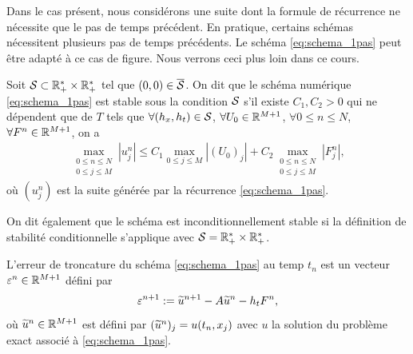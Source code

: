 \documentclass[12pt,a4paper,twoside]{article}
\begin{document}
\begin{remark}
  Dans le cas pr\'esent, nous consid\'erons une suite dont la formule de r\'ecurrence
  ne n\'ecessite que le pas de temps pr\'ec\'edent.
  En pratique, certains sch\'emas n\'ecessitent plusieurs pas de temps pr\'ec\'edents.
  Le sch\'ema \eqref{eq:schema_1pas} peut \^etre adapt\'e \`a ce cas de figure.
  Nous verrons ceci plus loin dans ce cours.
\end{remark}

\begin{definition}[Stabilit\'e]
  \label{def:stabilite}
  Soit $\mathcal{S} \subset \mathbb{R}_+^* \times \mathbb{R}_+^*$ tel que $(0,0) \in \overline{\mathcal{S}}$.
  On dit que le sch\'ema num\'erique \eqref{eq:schema_1pas} est stable 
  sous la condition $\mathcal{S}$ s'il existe $C_1 , C_2 > 0$ qui ne d\'ependent que de $T$
  tels que $\forall (h_x , h_t) \in \mathcal{S}$, $\forall U_0 \in \mathbb{R}^{M+1}$, 
  $\forall 0 \leq n \leq N$, $\forall F^n \in \mathbb{R}^{M+1}$, on a
  \begin{align}
    \max_{\substack{0\leq n \leq N\\ 0 \leq j \leq M}} | u_j^n | 
    \leq C_1 \max_{0 \leq j \leq M} | (U_0)_j | 
    + C_2 \max_{\substack{0\leq n \leq N\\ 0 \leq j \leq M}} | F_j^n | ,
  \end{align}
  o\`u $(u_j^n)$ est la suite g\'en\'er\'ee par la r\'ecurrence \eqref{eq:schema_1pas}.

  On dit \'egalement que le sch\'ema est inconditionnellement stable
  si la d\'efinition de stabilit\'e conditionnelle 
  s'applique avec $\mathcal{S} = \mathbb{R}_+^* \times \mathbb{R}_+^*$.
\end{definition}

\begin{definition}
  \label{def:troncature}
  L'erreur de troncature du sch\'ema \eqref{eq:schema_1pas}
  au temp $t_n$ est un vecteur $\varepsilon^n \in \mathbb{R}^{M+1}$
  d\'efini par
  \begin{align}
    \label{eq:troncature}
    \varepsilon^{n+1} := \widetilde{u}^{n+1} - A \widetilde{u}^n - h_t F^n ,
  \end{align}
  o\`u $\widetilde{u}^n \in \mathbb{R}^{M+1}$ est d\'efini par
  $(\widetilde{u}^n)_j = u(t_n,x_j)$ avec $u$ la solution du probl\`eme exact associ\'e \`a
  \eqref{eq:schema_1pas}.
\end{definition}
\end{document}
